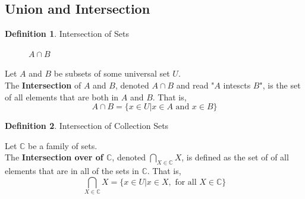 \documentclass{book}
\theoremstyle{definition}
\newtheorem{definition}{Definition}[section]
\theoremstyle{remark}
\newcommand{\bb}[1]{\mathbb{#1}}
\begin{document}
\subsection{Union and Intersection}
\begin{definition}
Intersection of Sets \\

\begin{figure}[H]
    \centering
        \def \setA{ (0,0) circle (1cm) }
        \def \setB{ (1.5,0) circle (1cm) }
        \def \myrectangle{ (-2, -1.5) rectangle (3.5, 1.5) }
            \begin{center}
            \end{center}
    \caption{$A \cap B$}
    \label{fig:AcapB}
\end{figure}

\begin{tcolorbox}
    Let $A$ and $B$ be subsets of some universal set $U$. \\
    The \textbf{Intersection} of $A$ and $B$, denoted $A \cap B$ and read "$A$ intescts $B$", is the set of all elements that are both in $A$ and $B$. That is,
        \begin{equation*}
            A \cap B = \{x \in U | x \in A \text{ and } x \in B \}
        \end{equation*}
\end{tcolorbox}
\end{definition}



\begin{definition}
Intersection of Collection Sets \\

\begin{tcolorbox}
    Let $\bb{C}$ be a family of sets. \\
    The \textbf{Intersection over of $\bb{C}$}, denoted $\bigcap_{X \in \bb{C}}{X}$, is defined as the set of of all elements that are in all of the sets in $\bb{C}$. That is,  
        \begin{equation*}
            \bigcap_{X \in \bb{C}}{X} = \{x \in U | x \in X, \text{ for all } X \in \bb{C} \}
        \end{equation*}
\end{tcolorbox}
\end{definition}
\end{document}
